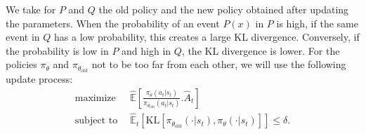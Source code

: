 \documentclass{article}
\begin{document}
We take for $P$ and $Q$ the old policy and the new policy obtained after updating the parameters. When the probability of an event $P(x)$ in $P$ is high, if the same event in $Q$ has a low probability, this creates a large KL divergence. Conversely, if the probability is low in $P$ and high in $Q$, the KL divergence is lower.
For the policies $\pi_{\theta}$ and $\pi_{\theta_\text{old}}$ not to be too far from each other, we will use the following update process:
\begin{equation*}
    \begin{aligned}
        \text{maximize }&\,\hat{\mathbb{E}}\left[ \frac{\pi_\theta(a_t |s_t)}{\pi_{\theta_{\text{old}}}(a_t |s_t)} .\hat{A}_t \right]\\
        \text{subject to }&\,\hat{\mathbb{E}}_t [\text{KL}[\pi_{\theta_{\text{old}}}(\cdot | s_t), \pi_{\theta}(\cdot|s_t)]] \leq \delta.
    \end{aligned}
\end{equation*}



\end{document}
